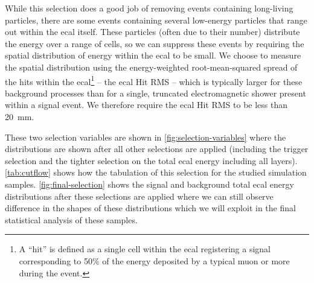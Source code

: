 While this selection does a good job of removing events containing long-living particles, there are some
events containing several low-energy particles that range out within the \ac{ecal} itself.
These particles (often due to their number) distribute the energy over a range of cells,
so we can suppress these events by requiring the spatial distribution of energy within the \ac{ecal} to be small.
We choose to measure the spatial distribution using the energy-weighted root-mean-squared spread of the
hits within the \ac{ecal}\footnote{
  A ``hit'' is defined as a single cell within the \ac{ecal} registering a signal corresponding to 50\% of
  the energy deposited by a typical muon or more during the event.
}
-- the \ac{ecal} Hit RMS -- which is typically larger for these background processes than for a single,
truncated electromagnetic shower present within a signal event.
We therefore require the \ac{ecal} Hit RMS to be less than \qty{20}{\mm}.

These two selection variables are shown in \cref{fig:selection-variables}
where the distributions are shown after all other selections are applied
(including the trigger selection and the tighter selection on the total \ac{ecal} energy including all layers).
\cref{tab:cutflow} shows how the tabulation of this selection for the studied simulation samples.
\cref{fig:final-selection} shows the signal and background total \ac{ecal} energy distributions after
these selections are applied where we can still observe difference in the shapes of these distributions which
we will exploit in the final statistical analysis of these samples.

